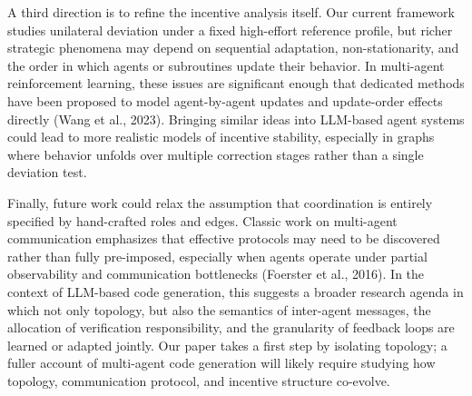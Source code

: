\documentclass[manuscript,screen,review]{acmart}
\begin{document}
A third direction is to refine the incentive analysis itself. Our current framework studies unilateral deviation under a fixed high-effort reference profile, but richer strategic phenomena may depend on sequential adaptation, non-stationarity, and the order in which agents or subroutines update their behavior. In multi-agent reinforcement learning, these issues are significant enough that dedicated methods have been proposed to model agent-by-agent updates and update-order effects directly (Wang et al., 2023). Bringing similar ideas into LLM-based agent systems could lead to more realistic models of incentive stability, especially in graphs where behavior unfolds over multiple correction stages rather than a single deviation test.

Finally, future work could relax the assumption that coordination is entirely specified by hand-crafted roles and edges. Classic work on multi-agent communication emphasizes that effective protocols may need to be discovered rather than fully pre-imposed, especially when agents operate under partial observability and communication bottlenecks (Foerster et al., 2016). In the context of LLM-based code generation, this suggests a broader research agenda in which not only topology, but also the semantics of inter-agent messages, the allocation of verification responsibility, and the granularity of feedback loops are learned or adapted jointly. Our paper takes a first step by isolating topology; a fuller account of multi-agent code generation will likely require studying how topology, communication protocol, and incentive structure co-evolve.

\nocite{*}


\end{document}
